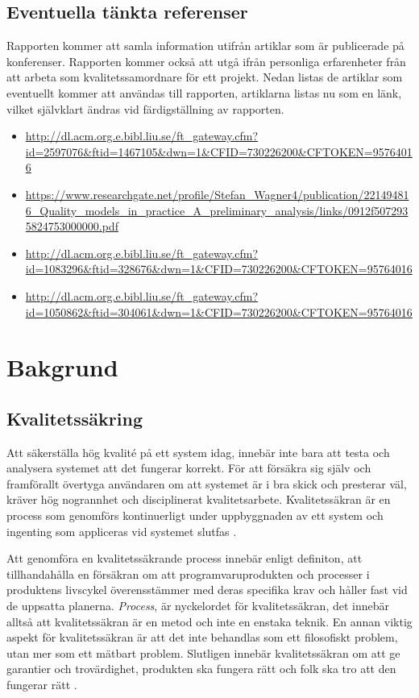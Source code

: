 \clearpage

\subsection{Eventuella tänkta referenser}

Rapporten kommer att samla information utifrån artiklar som är publicerade på konferenser. Rapporten kommer också att utgå ifrån personliga erfarenheter från att arbeta som kvalitetssamordnare för ett projekt. Nedan listas de artiklar som eventuellt kommer att användas till rapporten, artiklarna listas nu som en länk, vilket självklart ändras vid färdigställning av rapporten.

\begin{itemize}
	\item \url{http://dl.acm.org.e.bibl.liu.se/ft_gateway.cfm?id=2597076&ftid=1467105&dwn=1&CFID=730226200&CFTOKEN=95764016}
	\item \url{https://www.researchgate.net/profile/Stefan_Wagner4/publication/221494816_Quality_models_in_practice_A_preliminary_analysis/links/0912f5072935824753000000.pdf}
	\item \url{http://dl.acm.org.e.bibl.liu.se/ft_gateway.cfm?id=1083296&ftid=328676&dwn=1&CFID=730226200&CFTOKEN=95764016}
	\item 
	\url{	http://dl.acm.org.e.bibl.liu.se/ft_gateway.cfm?id=1050862&ftid=304061&dwn=1&CFID=730226200&CFTOKEN=95764016}

\end{itemize}

\section{Bakgrund}
\label{sec:background-wallstrom}
\subsection{Kvalitetssäkring}
Att säkerställa hög kvalité på ett system idag, innebär inte bara att testa och analysera systemet att det fungerar korrekt. För att försäkra sig själv och framförallt övertyga användaren om att systemet är i bra skick och presterar väl, kräver hög nogrannhet och disciplinerat kvalitetsarbete. Kvalitetssäkran är en process som genomförs kontinuerligt under uppbyggnaden av ett system och ingenting som appliceras vid systemet slutfas \cite{feldman2005quality}.

Att genomföra en kvalitetssäkrande process innebär enligt definiton, att tillhandahålla en försäkran om att programvaruprodukten och processer i produktens livscykel överensstämmer med deras specifika krav och håller fast vid de uppsatta planerna. \textit{Process}, är nyckelordet för kvalitetssäkran, det innebär alltså att kvalitetssäkran är en metod och inte en enstaka teknik. En annan viktig aspekt för kvalitetssäkran är att det inte behandlas som ett filosofiskt problem, utan mer som ett mätbart problem. Slutligen innebär kvalitetssäkran om att ge garantier och trovärdighet, produkten ska fungera rätt och folk ska tro att den fungerar rätt \cite{feldman2005quality}.

